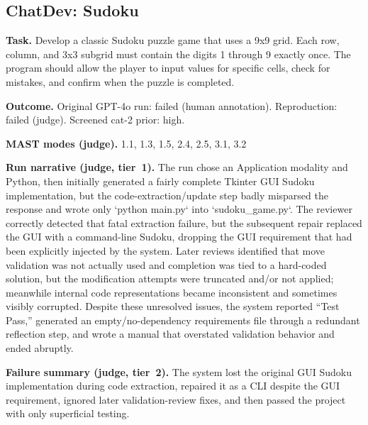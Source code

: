 \subsection*{ChatDev: Sudoku}
\textbf{Task.} Develop a classic Sudoku puzzle game that uses a 9x9 grid. Each row, column, and 3x3 subgrid must contain the digits 1 through 9 exactly once. The program should allow the player to input values for specific cells, check for mistakes, and confirm when the puzzle is completed.

\textbf{Outcome.} Original GPT-4o run: failed (human annotation). Reproduction: failed (judge). Screened cat-2 prior: high.

\textbf{MAST modes (judge).} 1.1, 1.3, 1.5, 2.4, 2.5, 3.1, 3.2

\textbf{Run narrative (judge, tier~1).} The run chose an Application modality and Python, then initially generated a fairly complete Tkinter GUI Sudoku implementation, but the code-extraction/update step badly misparsed the response and wrote only `python main.py` into `sudoku\_game.py`. The reviewer correctly detected that fatal extraction failure, but the subsequent repair replaced the GUI with a command-line Sudoku, dropping the GUI requirement that had been explicitly injected by the system. Later reviews identified that move validation was not actually used and completion was tied to a hard-coded solution, but the modification attempts were truncated and/or not applied; meanwhile internal code representations became inconsistent and sometimes visibly corrupted. Despite these unresolved issues, the system reported ``Test Pass,'' generated an empty/no-dependency requirements file through a redundant reflection step, and wrote a manual that overstated validation behavior and ended abruptly.

\textbf{Failure summary (judge, tier~2).} The system lost the original GUI Sudoku implementation during code extraction, repaired it as a CLI despite the GUI requirement, ignored later validation-review fixes, and then passed the project with only superficial testing.

